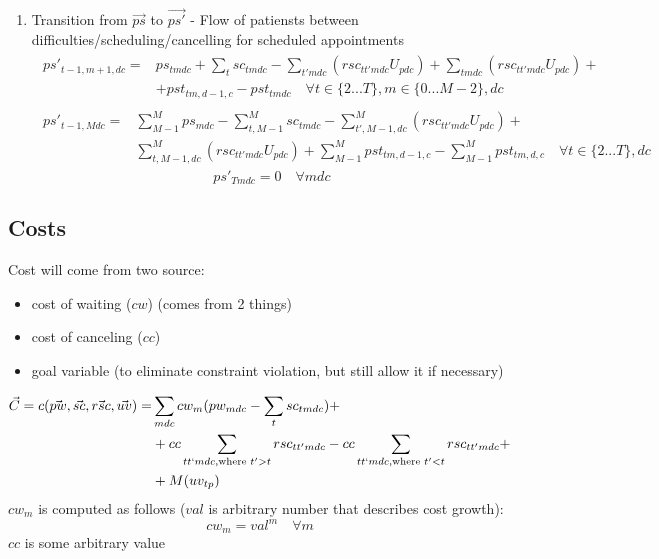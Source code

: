 \documentclass{article}
\begin{document}
\begin{enumerate}
	\item Transition from $\vec{ps}$ to $\vec{ps'}$ - Flow of patiensts between difficulties/scheduling/cancelling for scheduled appointments
		\begin{align}  \begin{split}
			ps'_{t-1,m+1,dc} = & ps_{tmdc} +  \sum_{t} sc_{tmdc} - \sum_{t'mdc} (rsc_{tt'mdc} U_{pdc}) + \sum_{tmdc} (rsc_{tt'mdc} U_{pdc}) +\\ 
										& + pst_{tm,d-1,c} - pst_{tmdc} \quad \forall t \in \{2 ... T\},  m \in \{0... M-2 \}, dc 
		\end{split} \end{align} 
		\begin{align} \begin{split}  
			ps'_{t-1,Mdc} = & \sum_{M-1}^M ps_{mdc}  - \sum_{t,M-1}^{M} sc_{tmdc}  - \sum_{t',M-1,dc}^M (rsc_{tt'mdc} U_{pdc}) + \\
									& \sum_{t,M-1,dc}^M (rsc_{tt'mdc} U_{pdc}) + \sum_{M-1}^{M} pst_{tm,d-1,c} - \sum_{M-1}^{M} pst_{tm,d,c}
									\quad \forall t \in \{2...T \}, dc 
		\end{split} \end{align}		
		\begin{equation}  
			ps'_{Tmdc} = 0 \quad \forall mdc 
		\end{equation} 
\end{enumerate}
    
\subsection{Costs}
Cost will come from two source:  
\begin{itemize} 
	\item cost of waiting ($cw$) (comes from 2 things)
	\item cost of canceling ($cc$)
	\item goal variable (to eliminate constraint violation, but still allow it if necessary)
\end{itemize}

\begin{align} \begin{split}  
	\vec{C} = c(\vec{pw}, \vec{sc}, \vec{rsc}, \vec{uv}) = & \sum_{mdc} cw_{m} (pw_{mdc} - \sum_{t} sc_{tmdc}) +  \\
		& + cc \sum_{tt`mdc, \text{where } t' > t} rsc_{tt'mdc} - cc \sum_{tt`mdc, \text{where } t' < t} rsc_{tt'mdc} + \\ 
		& + M (uv_{tp})
\end{split} \end{align} 
$cw_{m}$ is computed as follows ($val$ is arbitrary number that describes cost growth):
	\begin{equation}  cw_{m} = val^m \quad \forall m \end{equation} 
$cc$ is some arbitrary value
\end{document}

